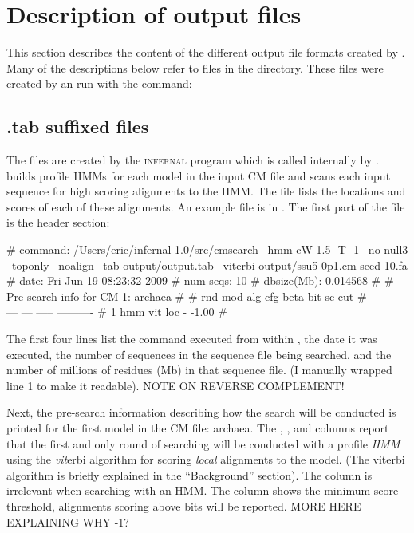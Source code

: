 \section{Description of output files}

This section describes the content of the different output file
formats created by . Many of the descriptions below
refer to files in the  directory. These files
were created by an  run with the command:

\subsection{.tab suffixed files}

The  files are created by the \textsc{infernal} program
 which is called internally by
.  builds profile HMMs for each model
in the input CM file and scans each input sequence for high scoring
alignments to the HMM. The  file lists the locations and
scores of each of these alignments. An example  file is in 
. The first part of the file is the
header section:

\begin{sreoutput}
# command:    /Users/eric/infernal-1.0/src/cmsearch --hmm-cW 1.5 -T -1 --no-null3 \\
--toponly --noalign --tab output/output.tab --viterbi output/ssu5-0p1.cm seed-10.fa
# date:       Fri Jun 19 08:23:32 2009
# num seqs:   10
# dbsize(Mb): 0.014568
#
# Pre-search info for CM 1: archaea
#
# rnd  mod  alg  cfg   beta  bit sc cut
# ---  ---  ---  ---  -----  ----------
#   1  hmm  vit  loc      -       -1.00
#
\end{sreoutput}

The first four lines list the  command executed from
within , the date it was executed, the number of
sequences in the sequence file being searched, and the number of
millions of residues (Mb) in that sequence file. (I manually
wrapped line 1 to make it readable). NOTE ON REVERSE COMPLEMENT!

Next, the pre-search information describing how the search will be
conducted is printed for the first model in the CM file: archaea. 
The , ,  and  columns report
that the first and only round of searching will be conducted with a
profile \emph{HMM} using the \emph{vit}erbi algorithm for scoring
\emph{local} alignments to the model. (The viterbi algorithm is
briefly explained in the ``Background'' section). The 
column is irrelevant when searching with an HMM. The 
column shows the minimum score threshold, alignments scoring above
 bits will be reported. MORE HERE EXPLAINING WHY -1?


